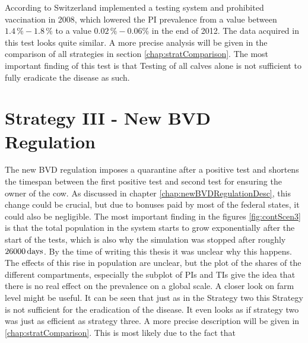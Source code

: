 According to \citep{hofig2014untersuchungen} Switzerland implemented a testing system and prohibited vaccination in 2008, which lowered the PI prevalence from a value between $1.4\,\%-1.8\,\%$ to a value $0.02\,\%-0.06\%$ in the end of 2012. The data acquired in this test looks quite similar. A more precise analysis will be given in the comparison of all strategies in section \ref{chap:stratComparison}. The most important finding of this test is that Testing of all calves alone is not sufficient to fully eradicate the disease as such.

\section{Strategy III - New BVD Regulation}
The new BVD regulation imposes a quarantine after a positive test and shortens the timespan between the first positive test and second test for ensuring the owner of the cow. As discussed in chapter \ref{chap:newBVDRegulationDesc}, this change could be crucial, but due to bonuses paid by most of the federal states, it could also be negligible. 
The most important finding in the figures \ref{fig:contScen3} is that the total population in the system starts to grow exponentially after the start of the tests, which is also why the simulation was stopped after roughly $26000\,\text{days}$. By the time of writing this thesis it was unclear why this happens. The effects of this rise in population are unclear, but the plot of the shares of the different compartments, especially the subplot of PIs and TIs give the idea that there is no real effect on the prevalence on a global scale. A closer look on farm level might be useful. It can be seen that just as in the Strategy two this Strategy is not sufficient for the eradication of the disease. It even looks as if strategy two was just as efficient as strategy three. A more precise description will be given in \ref{chap:stratComparison}.
This is most likely due to the fact that 
